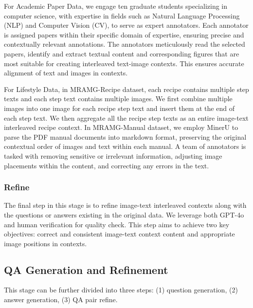 For Academic Paper Data, we engage ten graduate
students specializing in computer science, with expertise in fields such as Natural Language Processing (NLP) and Computer Vision (CV), to serve as expert annotators. 
Each annotator is assigned papers within their specific domain of expertise, ensuring precise and contextually relevant annotations. 
The annotators meticulously read the selected papers, identify and extract textual content and corresponding figures that are most suitable for creating interleaved text-image contexts. This ensures accurate alignment of text and images in contexts.

For Lifestyle Data, in MRAMG-Recipe dataset, each recipe contains multiple step texts and each step text contains multiple images. We first combine multiple images into one image for each recipe step text and insert them at the end of each step text. We then aggregate all the recipe step texts as an entire image-text interleaved recipe context. In MRAMG-Manual dataset, we employ MinerU \citep{wang2024mineru} to parse the PDF manual documents into markdown format, preserving the original contextual order of images and text within each manual.
A team of annotators is tasked with removing sensitive or irrelevant information, adjusting image placements within the content, and correcting any errors in the text.

\subsubsection{Refine}
The final step in this stage is to refine image-text interleaved contexts along with the questions or answers existing in the original data. We leverage both GPT-4o and human verification for quality check. This step aims to achieve two key objectives: correct and consistent image-text context content and appropriate image positions in contexts.


\subsection{QA Generation and Refinement}
This stage can be further divided into three steps: (1) question generation, (2) answer generation, (3) QA pair refine.

